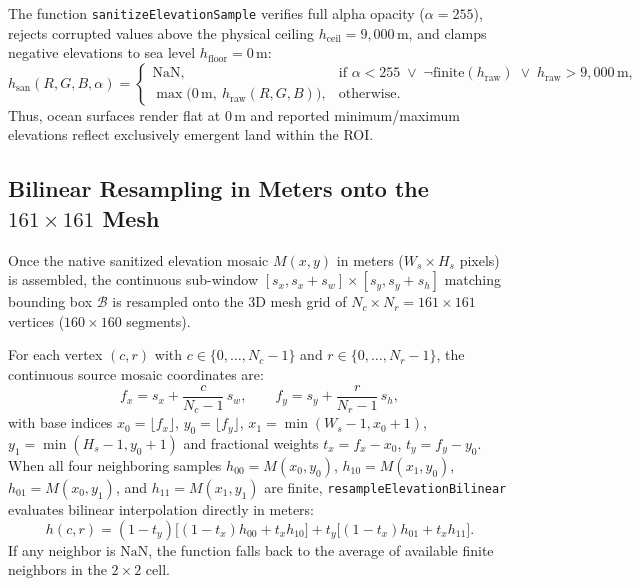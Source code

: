 \documentclass[11pt,a4paper]{article}
\newcommand{\unit}[1]{\mathrm{#1}}
\begin{document}
The function \texttt{sanitizeElevationSample} verifies full alpha opacity ($\alpha=255$), rejects corrupted values above the physical ceiling $h_{\mathrm{ceil}}=9,000\,\unit{m}$, and clamps negative elevations to sea level $h_{\mathrm{floor}}=0\,\unit{m}$:
\begin{equation}
  h_{\mathrm{san}}(R,G,B,\alpha) =
  \begin{cases}
    \mathrm{NaN}, & \text{if } \alpha < 255 \;\vee\; \neg\text{finite}(h_{\mathrm{raw}}) \;\vee\; h_{\mathrm{raw}} > 9,000\,\unit{m},\\[4pt]
    \max\bigl(0\,\unit{m},\ h_{\mathrm{raw}}(R,G,B)\bigr), & \text{otherwise.}
  \end{cases}
  \label{eq:saneamiento-costero}
\end{equation}
Thus, ocean surfaces render flat at $0\,\unit{m}$ and reported minimum/maximum elevations reflect exclusively emergent land within the ROI.

\subsection{Bilinear Resampling in Meters onto the \texorpdfstring{$161\times161$}{161x161} Mesh}
\label{sec:relieve3d-bilineal}

Once the native sanitized elevation mosaic $M(x,y)$ in meters ($W_s\times H_s$ pixels) is assembled, the continuous sub-window $[s_x, s_x+s_w]\times[s_y, s_y+s_h]$ matching bounding box $\mathcal{B}$ is resampled onto the 3D mesh grid of $N_c\times N_r = 161\times161$ vertices ($160\times160$ segments).

For each vertex $(c,r)$ with $c\in\{0,\ldots,N_c-1\}$ and $r\in\{0,\ldots,N_r-1\}$, the continuous source mosaic coordinates are:
\begin{equation}
  f_x = s_x + \frac{c}{N_c - 1}\,s_w,
  \qquad
  f_y = s_y + \frac{r}{N_r - 1}\,s_h,
\end{equation}
with base indices $x_0=\lfloor f_x\rfloor$, $y_0=\lfloor f_y\rfloor$, $x_1=\min(W_s-1,x_0+1)$, $y_1=\min(H_s-1,y_0+1)$ and fractional weights $t_x = f_x - x_0$, $t_y = f_y - y_0$. When all four neighboring samples $h_{00}=M(x_0,y_0)$, $h_{10}=M(x_1,y_0)$, $h_{01}=M(x_0,y_1)$, and $h_{11}=M(x_1,y_1)$ are finite, \texttt{resampleElevationBilinear} evaluates bilinear interpolation directly in meters:
\begin{equation}
  h(c,r) = (1 - t_y)\bigl[(1 - t_x)h_{00} + t_x h_{10}\bigr]
         + t_y\bigl[(1 - t_x)h_{01} + t_x h_{11}\bigr].
  \label{eq:bilineal-metros}
\end{equation}
If any neighbor is $\mathrm{NaN}$, the function falls back to the average of available finite neighbors in the $2\times2$ cell.
\end{document}
